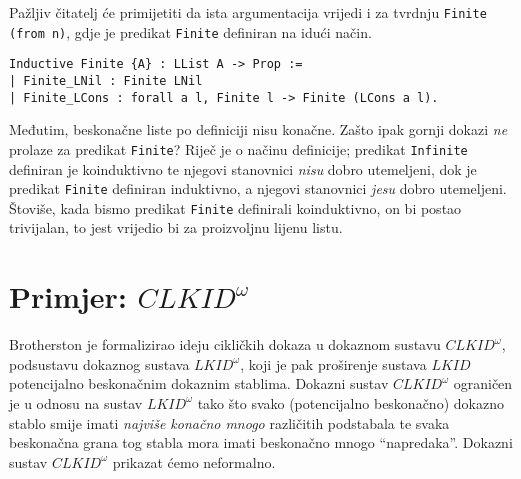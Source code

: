 Pažljiv čitatelj će primijetiti da ista argumentacija vrijedi
i za tvrdnju \texttt{Finite (from n)}, gdje je predikat \texttt{Finite} definiran na idući način.
\begin{verbatim}
Inductive Finite {A} : LList A -> Prop :=
| Finite_LNil : Finite LNil
| Finite_LCons : forall a l, Finite l -> Finite (LCons a l).
\end{verbatim}
\noindent Međutim, beskonačne liste po definiciji nisu konačne.
Zašto ipak gornji dokazi \textit{ne} prolaze za predikat \texttt{Finite}?
Riječ je o načinu definicije; predikat \texttt{Infinite} definiran je koinduktivno
te njegovi stanovnici \textit{nisu} dobro utemeljeni,
dok je predikat \texttt{Finite} definiran induktivno, a njegovi stanovnici \textit{jesu}
dobro utemeljeni. Štoviše, kada bismo predikat \texttt{Finite} definirali koinduktivno,
on bi postao trivijalan, to jest vrijedio bi za proizvoljnu lijenu listu.

\section{Primjer: \(\mathit{CLKID}^{\omega}\)}
Brotherston je formalizirao ideju cikličkih dokaza u dokaznom sustavu
\(\mathit{CLKID}^{\omega}\), podsustavu dokaznog sustava \(\mathit{LKID}^{\omega}\),
koji je pak proširenje sustava \(\mathit{LKID}\) potencijalno beskonačnim dokaznim stablima.
Dokazni sustav \(\mathit{CLKID}^{\omega}\) ograničen je u odnosu na sustav \(\mathit{LKID}^{\omega}\)
tako što svako (potencijalno beskonačno) dokazno stablo
smije imati \textit{najviše konačno mnogo} različitih podstabala te
svaka beskonačna grana tog stabla mora imati beskonačno mnogo \enquote{napredaka}.
Dokazni sustav \(\mathit{CLKID}^{\omega}\) prikazat ćemo neformalno.

